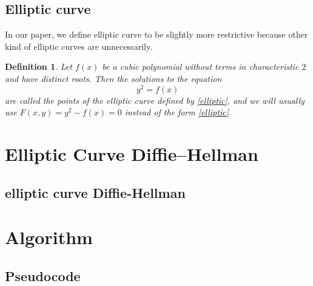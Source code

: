 \documentclass[11pt]{article}
\newtheorem{definition}{Definition}
\begin{document}
\subsection{Elliptic curve}
In our paper, we define elliptic curve to be slightly more restrictive because other kind of elliptic curves are unnecessarily.
\begin{definition}
Let $f(x)$ be a cubic polynomial without terms in characteristic $2$ and have distinct roots. Then the solutions to the equation
\begin{equation}
y^2 = f(x) \label{elliptic}
\end{equation}
are called the points of the elliptic curve defined by \ref{elliptic}, and we will usually use $F(x,y) = y^2 - f(x) = 0$ instead of the form \ref{elliptic}.
\end{definition}

\section{Elliptic Curve Diffie–Hellman}

\subsection{elliptic curve Diffie-Hellman}

\section{Algorithm}

\subsection{Pseudocode}

\newpage

{}

\end{document}
